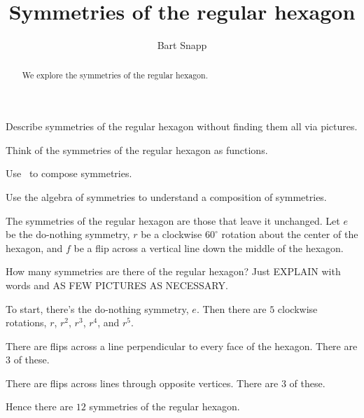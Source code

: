 \documentclass[noauthor,nooutcomes,hints]{ximera}
\title{Symmetries of the regular hexagon}
\author{Bart Snapp}
\begin{document}
\begin{abstract}
  We explore the symmetries of the regular hexagon.
\end{abstract}
\maketitle

\begin{listOutcomes}
\item Describe symmetries of the regular hexagon without finding them
  all via pictures.
\item Think of the symmetries of the regular hexagon as functions.
\item Use \snap\ to compose symmetries.
\item Use the algebra of symmetries to understand a composition of
  symmetries.
\end{listOutcomes}
\mynewpage


\begin{question}
  The symmetries of the regular hexagon are those that leave it
  unchanged. Let $e$ be the do-nothing symmetry, $r$ be a clockwise
  $60^\circ$ rotation about the center of the hexagon, and $f$ be a
  flip across a vertical line down the middle of the hexagon.

  
  How many symmetries are there of the regular hexagon? Just
  EXPLAIN with words and AS FEW PICTURES AS NECESSARY.
  \begin{freeResponse}
    To start, there's the do-nothing symmetry, $e$. Then there are
    $5$ clockwise rotations, $r$, $r^2$, $r^3$, $r^4$, and $r^5$.

    There are flips across a line perpendicular to every face of the
    hexagon. There are $3$ of these.

    There are flips across lines through opposite vertices. There are
    $3$ of these.

    Hence there are $12$ symmetries of the regular hexagon.
  \end{freeResponse}
\end{question}
\mynewpage
\end{document}

